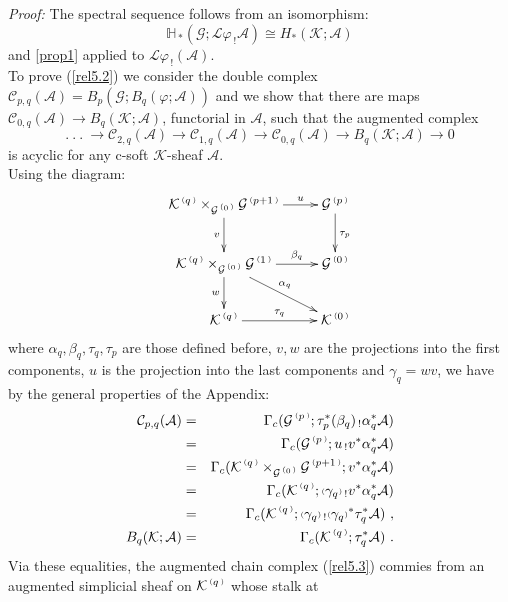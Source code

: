 \documentclass[a4paper]{article}
\newcommand{\f}{\ensuremath{\varphi}}
\newcommand{\rmap}{\longrightarrow}
\newcommand{\Ka}{\ensuremath{\mathcal{K}}}
\newcommand{\G}{\ensuremath{\mathcal{G}}}
\newcommand{\A}{\ensuremath{\mathcal{A}}}
\newcommand{\el}{\ensuremath{\mathcal{L}}}
\newcommand{\C}{\ensuremath{\mathcal{C}}}
\newcommand{\gc}{\ensuremath{\Gamma_c}}
\newcommand{\ps}{{\raise 1pt\hbox{\tiny (}}}
\newcommand{\pd}{{\raise 1pt\hbox{\tiny )}}}
\newcommand{\nG}[1]{\ensuremath{\G^{\,\ps #1\,\pd}}}
\newcommand{\nK}[1]{\ensuremath{\Ka^{\,\ps #1\,\pd}}}
\begin{document}
\emph{Proof:} The spectral sequence follows from an isomorphism:
\begin{equation}
\label{rel5.2}
\mathbb{H}_{\, *}(\G; \el\f_{\, !}\A) \cong H_{*}(\Ka; \A) 
\end{equation}
and \ref{prop1} applied to $\el\f_{\, !}(\A)$.\\
\hspace*{.3in} To prove (\ref{rel5.2}) we consider the double complex $\C_{p,q}(\A) = B_{p}(\G; B_{q}(\f; \A))$ and we show that there are maps $\C_{0,q}(\A) \rmap B_{q}(\Ka; \A)$, functorial in $\A$, such that the augmented complex
\begin{equation}
\label{rel5.3}
 .\ .\ .\ \rmap \C_{2,q}(\A) \rmap \C_{1,q}(\A) \rmap \C_{0,q}(\A) \rmap B_{q}(\Ka; \A) \rmap 0 
\end{equation}
is acyclic for any c-soft $\Ka$-sheaf $\A$.\\
\hspace*{.3in} Using the diagram:
\[ \xymatrix{
\nK{q}\times_{\nG{0}} \nG{p+1} \ar[d]_-{v}\ar[r]^-{u} & \nG{p} \ar[d]^{\tau_{p}}\\
\nK{q}\times_{\nG{0}} \nG{1} \ar[d]_-{w}\ar[r]^-{\beta_{q}}\ar[rd]^{\alpha_{q}} & \nG{0} \\
\nK{q} \ar[r]^-{\tau_{q}} & \nK{0} } \]
where $\alpha_{q}, \beta_{q}, \tau_{q}, \tau_{p}$ are those defined before, $v, w$ are the projections into the first components, $u$ is the projection into the last components and $\gamma_{q}= wv$, we have by the general properties of the Appendix:
\begin{eqnarray}
\C_{p,q}(\A)    & = & \gc (\nG{p} ; \tau_{p}^{*} (\beta_{q})_{\, !} \alpha_{q}^{*} \A ) \nonumber\\
                & = & \gc (\nG{p} ; u_{\, !} v^{*} \alpha_{q}^{*} \A ) \nonumber\\
                & = & \gc (\nK{q} \times_{\nG{0}} \nG{p+1} ; v^{*} \alpha_{q}^{*} \A ) \nonumber\\
                & = & \gc (\nK{q} ; \ps \gamma_{q}\pd_{\, !} v^{*} \alpha_{q}^{*} \A ) \nonumber\\
                & = & \gc (\nK{q} ; \ps \gamma_{q}\pd_{\, !} \ps \gamma_{q}\pd^{*} \tau_{q}^{*} \A )\ ,\nonumber\\ 
B_{q}(\Ka; \A)  & = & \gc(\nK{q}; \tau_{q}^{*}\A) \ . \nonumber
\end{eqnarray}
\hspace*{.3in} Via these equalities, the augmented chain complex (\ref{rel5.3}) commies from an augmented simplicial sheaf on $\nK{q}$ whose stalk at
\end{document}
